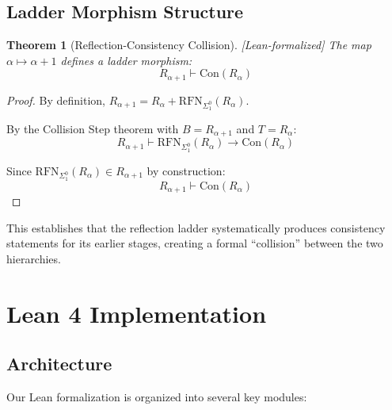 \documentclass[11pt]{article}
\newtheorem{theorem}{Theorem}[section]
\newcommand{\Con}{\mathrm{Con}}
\newcommand{\RFNSigOne}{\mathrm{RFN}_{\Sigma^0_1}}
\newcommand{\leanok}{\textsf{\textcolor{green!70!black}{[Lean-formalized]}}}
\begin{document}
\subsection{Ladder Morphism Structure}

\begin{theorem}[Reflection-Consistency Collision] \leanok
The map $\alpha \mapsto \alpha + 1$ defines a ladder morphism:
$$R_{\alpha+1} \vdash \Con(R_\alpha)$$
\end{theorem}

\begin{proof}
By definition, $R_{\alpha+1} = R_\alpha + \RFNSigOne(R_\alpha)$.

By the Collision Step theorem with $B = R_{\alpha+1}$ and $T = R_\alpha$:
$$R_{\alpha+1} \vdash \RFNSigOne(R_\alpha) \to \Con(R_\alpha)$$

Since $\RFNSigOne(R_\alpha) \in R_{\alpha+1}$ by construction:
$$R_{\alpha+1} \vdash \Con(R_\alpha)$$
\end{proof}

This establishes that the reflection ladder systematically produces consistency statements for its earlier stages, creating a formal ``collision'' between the two hierarchies.

\section{Lean 4 Implementation}

\subsection{Architecture}

Our Lean formalization is organized into several key modules:
\end{document}
